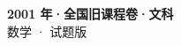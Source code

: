 \documentclass[zihao=-4, a4paper]{ctexart}
\begin{document}
\begin{center}
  {\Large\bfseries 2001 年·全国旧课程卷·文科}\\[4pt]
  {\large 数学 · 试题版}
\end{center}
\medskip
{}

\end{document}
